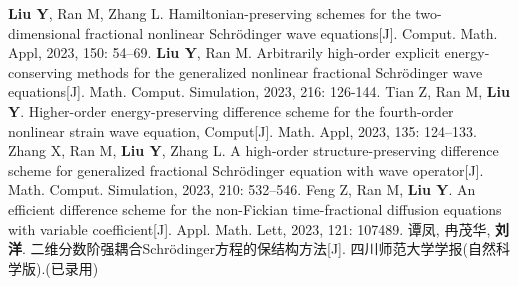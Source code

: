    \begin{mypaper}
      \begin{thebibliography}{99}  
       \textbf{Liu Y}, Ran M, Zhang L. Hamiltonian-preserving schemes for the two-dimensional fractional nonlinear Schrödinger wave equations[J]. Comput. Math. Appl, 2023, 150: 54–69.
       \textbf{Liu Y}, Ran M. Arbitrarily high-order explicit energy-conserving methods for the generalized nonlinear fractional Schrödinger wave equations[J]. Math. Comput. Simulation, 2023, 216: 126-144.
       Tian Z, Ran M, \textbf{Liu Y}. Higher-order energy-preserving difference scheme for the fourth-order nonlinear strain wave equation, Comput[J]. Math. Appl, 2023, 135: 124–133.
       Zhang X, Ran M, \textbf{Liu Y}, Zhang L. A high-order structure-preserving difference scheme for generalized fractional Schrödinger equation with wave operator[J]. Math. Comput. Simulation, 2023, 210: 532–546.
       Feng Z, Ran M, \textbf{Liu Y}. An efficient difference scheme for the non-Fickian time-fractional diffusion equations with variable coefficient[J]. Appl. Math. Lett, 2023, 121: 107489.
       谭凤, 冉茂华, \textbf{刘洋}. 二维分数阶强耦合Schr{\"o}dinger方程的保结构方法[J]. 四川师范大学学报(自然科学版).(已录用)
      \end{thebibliography}
   \end{mypaper}
   